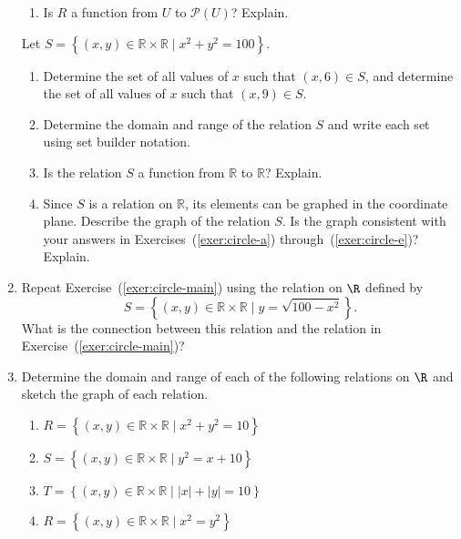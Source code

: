 \begin{enumerate}
\begin{enumerate}
  \item Is  $R$  a function from  $U$  to  $\mathcal{P}( U )$?  Explain.
\end{enumerate}

\xitem Let  
$S = \left\{ {\left( {x, y} \right) \in \mathbb{R} \times \mathbb{R} \mid x^2  + y^2  = 100} \right\}$. \label{exer:circle-main} %

\begin{enumerate}
  \item Determine the set of all values of  $x$  such that  $\left( {x, 6} \right) \in S$, and determine the set of all values of $x$  such that  $\left( {x, 9} \right) \in S$\!. 
\label{exer:circle-a}

  \item Determine the domain and range of the relation  $S$ and write each set using set builder notation.  


  \item Is the relation  $S$  a function from  $\mathbb{R}$ to  $\mathbb{R}$?  Explain.                  \label{exer:circle-e}

  \item Since  $S$ is a relation on  $\mathbb{R}$, its elements can be graphed in the coordinate         plane.  Describe the graph of the relation  $S$. Is the graph consistent with your answers in Exercises~(\ref{exer:circle-a}) through~(\ref{exer:circle-e})?  Explain.
\end{enumerate}

\item Repeat Exercise~(\ref{exer:circle-main}) using the relation on $\R$ defined by
\[
S = \left\{ {\left( {x, y} \right) \in \mathbb{R} \times \mathbb{R}   \mid y = \sqrt {100 - x^2 } } \right\}\!.\]
What is the connection between this relation and the relation in Exercise~(\ref{exer:circle-main})? \label{exer:semicircle}

\item Determine the domain and range of each of the following relations on $\R$ and sketch the graph of each relation.
\begin{enumerate}
\item $R = \left\{ {\left( {x, y} \right) \in \mathbb{R} \times \mathbb{R} \mid x^2  + y^2  = 10} \right\}$
\item $S = \left\{ {\left( {x, y} \right) \in \mathbb{R} \times \mathbb{R} \mid y^2  = x+10} \right\}$
\item $T = \left\{ {\left( {x, y} \right) \in \mathbb{R} \times \mathbb{R} \mid |x| + |y| = 10} \right\}$
\item $R = \left\{ {\left( {x, y} \right) \in \mathbb{R} \times \mathbb{R} \mid x^2  =y^2} \right\}$
\end{enumerate}



\end{enumerate}
